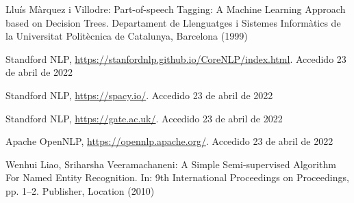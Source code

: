 \documentclass[runningheads]{llncs}
\begin{document}
\begin{thebibliography}{8}
Lluís Màrquez i Villodre: Part-of-speech Tagging: A Machine Learning Approach based on Decision Trees. Departament de Llenguatges i Sistemes Informàtics de la Universitat Politècnica de Catalunya, Barcelona (1999)

Standford NLP, \url{https://stanfordnlp.github.io/CoreNLP/index.html}. Accedido 23 de abril de 2022

Standford NLP, \url{https://spacy.io/}. Accedido 23 de abril de 2022

Standford NLP, \url{https://gate.ac.uk/}. Accedido 23 de abril de 2022

Apache OpenNLP, \url{https://opennlp.apache.org/}. Accedido 23 de abril de 2022

Wenhui Liao, Sriharsha Veeramachaneni: A Simple Semi-supervised Algorithm For
Named Entity Recognition. In: 9th International Proceedings
on Proceedings, pp. 1--2. Publisher, Location (2010)

\end{thebibliography}
\end{document}
